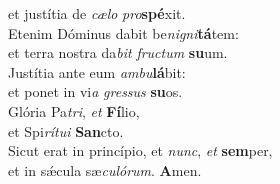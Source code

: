 \evenverse et justítia de \textit{cæ}\textit{lo} \textit{pro}\textbf{spé}xit.\\
\oddverse Etenim Dóminus dabit be\textit{ni}\textit{gni}\textbf{tá}tem:~\*\\
\oddverse et terra nostra da\textit{bit} \textit{fru}\textit{ctum} \textbf{su}um.\\
\evenverse Justítia ante eum \textit{am}\textit{bu}\textbf{lá}bit:~\*\\
\evenverse et ponet in vi\textit{a} \textit{gres}\textit{sus} \textbf{su}os.\\
\oddverse Glória Pa\textit{tri}, \textit{et} \textbf{Fí}lio,~\*\\
\oddverse et Spi\textit{rí}\textit{tu}\textit{i} \textbf{San}cto.\\
\evenverse Sicut erat in princípio, et \textit{nunc}, \textit{et} \textbf{sem}per,~\*\\
\evenverse et in sǽcula sæ\textit{cu}\textit{ló}\textit{rum}. \textbf{A}men.\\

